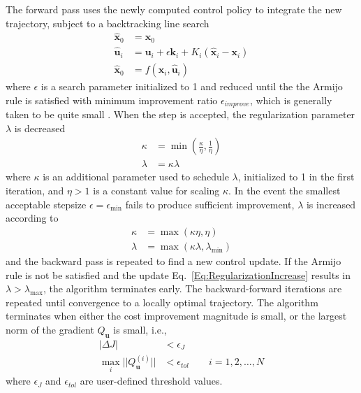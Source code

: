 \documentclass[journal ]{new-aiaa}
\newcommand{\state}{\ensuremath{\mathbf{x}}}
\newcommand{\control}{\ensuremath{\mathbf{u}}}
\begin{document}
The forward pass uses the newly computed control policy to integrate the new trajectory, subject to a backtracking line search
\begin{align}
\hat{\state}_0 &= \state_0 \\
\hat{\control}_{i} &= \control_i + \epsilon \mathbf{k}_i + K_i(\hat{\state}_i - \state_i)\\
\hat{\state}_0 &= f(\hat{\state}_i,\hat{\control}_i)
\end{align}
where $\epsilon$ is a search parameter initialized to 1 and reduced until the the Armijo rule \cite{Armijo} is satisfied with
minimum improvement ratio $\epsilon_{improve}$, which is generally taken to be quite small \cite{Optimization:Nocedal}.
When the step is accepted, the regularization parameter $\lambda$ is decreased
\begin{align}
	\kappa &= \min(\frac{\kappa}{\eta}, \frac{1}{\eta})\\
	\lambda &= \kappa\lambda \label{Eq:Regularizationdecrease}
\end{align} 
where $\kappa$ is an additional parameter used to schedule $\lambda$, initialized to 1 in the first iteration, and $\eta>1$ is a constant value for scaling $\kappa$. 
In the event the smallest acceptable stepsize $\epsilon=\epsilon_{\min}$ fails to produce sufficient improvement, $\lambda$ is increased according to
\begin{align}
	\kappa &= \max(\kappa\eta, \eta) \\
	\lambda &= \max(\kappa\lambda,\lambda_{\min}) \label{Eq:RegularizationIncrease}
\end{align} 
and the backward pass is repeated to find a new control update. If the Armijo rule is not be satisfied and the update Eq.~\eqref{Eq:RegularizationIncrease} results in $\lambda>\lambda_{\max}$, the algorithm terminates early. 
The backward-forward iterations are repeated until convergence to a locally optimal trajectory. The algorithm terminates when either the cost improvement magnitude is small, or the largest norm of the gradient $Q_\control$ is small, i.e.,
\begin{align}
	|\Delta J| &< \epsilon_J \label{Eq:ConvergenceCost}\\
	\max_i ||Q^{(i)}_{\control}|| &< \epsilon_{tol}\qquad i=1,2,\dots,N \label{Eq:ConvergenceGradient}
\end{align}
where $ \epsilon_J $ and $\epsilon_{tol}$ are user-defined threshold values.
%
\end{document}
